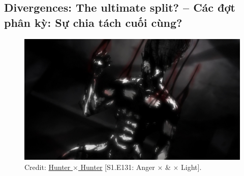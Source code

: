 \documentclass[12pt]{article}
\begin{document}
\subsection{Divergences: The ultimate split? -- Các đợt phân kỳ: Sự chia tách cuối cùng?}
\begin{flushright}
	\musEighth[\href{https://www.youtube.com/watch?v=_4m02-f9aQs}{Hyori Ittai Lamento for Piano} | Hunter $\times$ Hunter]\musEighth
\end{flushright}

\begin{figure}[H]
	\centering
	\includegraphics[width = 15cm]{Gon_berserk}
	\caption{Credit: \href{https://www.imdb.com/title/tt3748420/}{Hunter $\times$ Hunter} [S1.E131: Anger $\times$ \& $\times$ Light].}
\end{figure}
\end{document}
